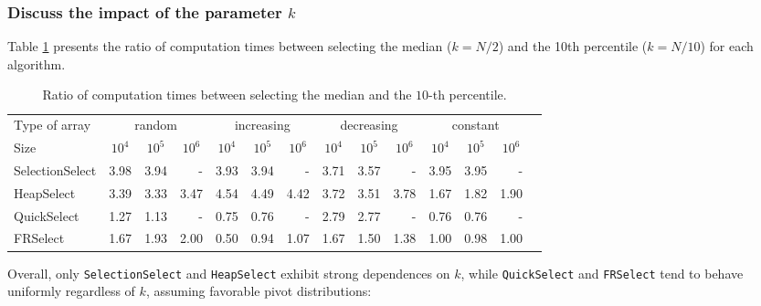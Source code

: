 \documentclass[acmconf,nonacm=true]{acmart}
\begin{document}
\subsubsection{Discuss the impact of the parameter $k$}

Table \ref{table:k-impact} presents the ratio of computation times between selecting the median ($k=N/2$) and the 10th percentile ($k=N/10$) for each algorithm.

\begin{table}[h!]
    \centering
    \footnotesize
    \caption{Ratio of computation times between selecting the median and the $10$-th percentile.}
    \label{table:k-impact}
    \begin{tabular}{llrrrrrrrrrrrr}
        \toprule
        {Type of array} & \multicolumn{3}{c}{{random}} & \multicolumn{3}{c}{{increasing}} & \multicolumn{3}{c}{{decreasing}} & \multicolumn{3}{c}{{constant}} \\
        \cmidrule(r){2-4} \cmidrule(lr){5-7} \cmidrule(lr){8-10} \cmidrule(l){11-13}
        {Size} & \multicolumn{1}{c}{$10^4$} & \multicolumn{1}{c}{$10^5$} & \multicolumn{1}{c}{$10^6$} & \multicolumn{1}{c}{$10^4$} & \multicolumn{1}{c}{$10^5$} & \multicolumn{1}{c}{$10^6$} & \multicolumn{1}{c}{$10^4$} & \multicolumn{1}{c}{$10^5$} & \multicolumn{1}{c}{$10^6$} & \multicolumn{1}{c}{$10^4$} & \multicolumn{1}{c}{$10^5$} & \multicolumn{1}{c}{$10^6$} \\
        \midrule 
        SelectionSelect & 3.98 & 3.94 & - & 3.93 & 3.94 & - & 3.71 & 3.57 & - & 3.95 & 3.95 & - \\
        HeapSelect & 3.39 & 3.33 & 3.47 & 4.54 & 4.49 & 4.42 & 3.72 & 3.51 & 3.78 & 1.67 & 1.82 & 1.90 \\
        QuickSelect & 1.27 & 1.13 & - & 0.75 & 0.76 & - & 2.79 & 2.77 & - & 0.76 & 0.76 & - \\
        FRSelect & 1.67 & 1.93 & 2.00 & 0.50 & 0.94 & 1.07 & 1.67 & 1.50 & 1.38 & 1.00 & 0.98 & 1.00 \\
        \bottomrule
    \end{tabular}
\end{table}

Overall, only \texttt{SelectionSelect} and \texttt{HeapSelect} exhibit strong dependences on $k$, while \texttt{QuickSelect} and \texttt{FRSelect} tend to behave uniformly regardless of $k$, assuming favorable pivot distributions:
\end{document}

